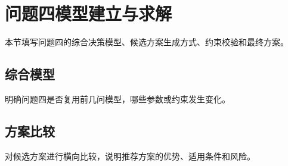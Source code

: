 \section{问题四模型建立与求解}
\label{sec:model-4}

本节填写问题四的综合决策模型、候选方案生成方式、约束校验和最终方案。

\subsection{综合模型}

明确问题四是否复用前几问模型，哪些参数或约束发生变化。

\subsection{方案比较}

对候选方案进行横向比较，说明推荐方案的优势、适用条件和风险。
